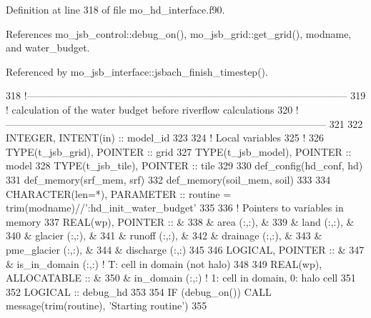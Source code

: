 Definition at line 318 of file mo\+\_\+hd\+\_\+interface.\+f90.



References mo\+\_\+jsb\+\_\+control\+::debug\+\_\+on(), mo\+\_\+jsb\+\_\+grid\+::get\+\_\+grid(), modname, and water\+\_\+budget.



Referenced by mo\+\_\+jsb\+\_\+interface\+::jsbach\+\_\+finish\+\_\+timestep().


\begin{DoxyCode}
318   \textcolor{comment}{!------------------------------------------------------------------------------------------------}
319   \textcolor{comment}{! calculation of the water budget before riverflow calculations}
320   \textcolor{comment}{!------------------------------------------------------------------------------------------------}
321 
322     \textcolor{keywordtype}{INTEGER}, \textcolor{keywordtype}{INTENT(in)} :: model\_id
323 
324     \textcolor{comment}{! Local variables}
325     \textcolor{comment}{!}
326     \textcolor{keywordtype}{TYPE}(t\_jsb\_grid),  \textcolor{keywordtype}{POINTER}    :: grid
327     \textcolor{keywordtype}{TYPE}(t\_jsb\_model), \textcolor{keywordtype}{POINTER}    :: model
328     \textcolor{keywordtype}{TYPE}(t\_jsb\_tile),  \textcolor{keywordtype}{POINTER}    :: tile
329 
330     def\_config(hd\_conf, hd)
331     def\_memory(srf\_mem, srf)
332     def\_memory(soil\_mem, soil)
333 
334     \textcolor{keywordtype}{CHARACTER(len=*)},  \textcolor{keywordtype}{PARAMETER}  :: routine = trim(modname)//\textcolor{stringliteral}{':hd\_init\_water\_budget'}
335 
336     \textcolor{comment}{! Pointers to variables in memory}
337     \textcolor{keywordtype}{REAL(wp)}, \textcolor{keywordtype}{POINTER} ::    &
338       & area         (:,:), &
339       & land         (:,:), &
340       & glacier      (:,:), &
341       & runoff       (:,:), &
342       & drainage     (:,:), &
343       & pme\_glacier  (:,:), &
344       & discharge    (:,:)
345 
346     \textcolor{keywordtype}{LOGICAL}, \textcolor{keywordtype}{POINTER}  ::   &
347       & is\_in\_domain    (:,:) \textcolor{comment}{! T: cell in domain (not halo) }
348 
349     \textcolor{keywordtype}{REAL(wp)}, \textcolor{keywordtype}{ALLOCATABLE}  ::   &
350       & in\_domain       (:,:) \textcolor{comment}{! 1: cell in domain, 0: halo cell}
351 
352     \textcolor{keywordtype}{LOGICAL} :: debug\_hd
353 
354     \textcolor{keywordflow}{IF} (debug\_on()) \textcolor{keyword}{CALL }message(trim(routine), \textcolor{stringliteral}{'Starting routine'})
355 

\end{DoxyCode}
